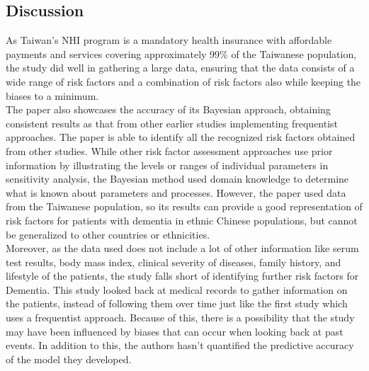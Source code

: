 \documentclass[12pt,letterpaper]{article}
\begin{document}
\subsection{Discussion}
As Taiwan's NHI program is a mandatory health insurance with affordable payments and services covering approximately 99\% of the Taiwanese population, the study did well in gathering a large data, ensuring that the data consists of a wide range of risk factors and a combination of risk factors also while keeping the biases to a minimum. \\

The paper also showcases the accuracy of its Bayesian approach, obtaining consistent results as that from other earlier studies implementing frequentist approaches. The paper is able to identify all the recognized risk factors obtained from other studies. While other risk factor assessment approaches use prior information by illustrating the levels or ranges of individual parameters in sensitivity analysis, the Bayesian method used domain knowledge to determine what is known about parameters and processes. However, the paper used data from the Taiwanese population, so its results can provide a good representation of risk factors for patients with dementia in ethnic Chinese populations, but cannot be generalized to other countries or ethnicities. \\

Moreover, as the data used does not include a lot of other information like  serum test results, body mass index, clinical severity of diseases, family history, and lifestyle of the patients, the study falls short of identifying further risk factors for Dementia. This study looked back at medical records to gather information on the patients, instead of following them over time just like the first study which uses a frequentist approach. Because of this, there is a possibility that the study may have been influenced by biases that can occur when looking back at past events. In addition to this, the authors hasn't quantified the predictive accuracy of the model they developed. 
\end{document}
